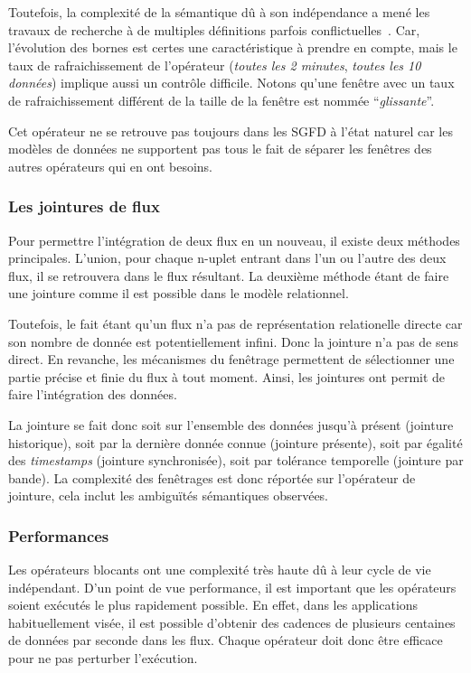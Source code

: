 Toutefois, la complexité de la sémantique dû à son indépendance a mené les travaux de recherche à de multiples définitions parfois conflictuelles~\cite{Jain:spread}. Car, l'évolution des bornes est certes une caractéristique à prendre en compte, mais le taux de rafraichissement de l'opérateur (\textit{toutes les 2 minutes}, \textit{toutes les 10 données}) implique aussi un contrôle difficile. Notons qu'une fenêtre avec un taux de rafraichissement différent de la taille de la fenêtre est nommée \enquote{\it glissante}.

Cet opérateur ne se retrouve pas toujours dans les SGFD à l'état naturel car les modèles de données ne supportent pas tous le fait de séparer les fenêtres des autres opérateurs qui en ont besoins.

\subsubsection{Les jointures de flux}
Pour permettre l'intégration de deux flux en un nouveau, il existe deux méthodes principales. L'union, pour chaque n-uplet entrant dans l'un ou l'autre des deux flux, il se retrouvera dans le flux résultant. La deuxième méthode étant de faire une jointure comme il est possible dans le modèle relationnel.

Toutefois, le fait étant qu'un flux n'a pas de représentation relationelle directe car son nombre de donnée est potentiellement infini. Donc la jointure n'a pas de sens direct. En revanche, les mécanismes du fenêtrage permettent de sélectionner une partie précise et finie du flux à tout moment. Ainsi, les jointures ont permit de faire l'intégration des données.

La jointure se fait donc soit sur l'ensemble des données jusqu'à présent (jointure historique), soit par la dernière donnée connue (jointure présente), soit par égalité des \textit{timestamps} (jointure synchronisée), soit par tolérance temporelle (jointure par bande). La complexité des fenêtrages est donc réportée sur l'opérateur de jointure, cela inclut les ambiguïtés sémantiques observées.

\subsubsection{Performances}
Les opérateurs blocants ont une complexité très haute dû à leur cycle de vie indépendant. D'un point de vue performance, il est important que les opérateurs soient exécutés le plus rapidement possible. En effet, dans les applications habituellement visée, il est possible d'obtenir des cadences de plusieurs centaines de données par seconde dans les flux. Chaque opérateur doit donc être efficace pour ne pas perturber l'exécution.

